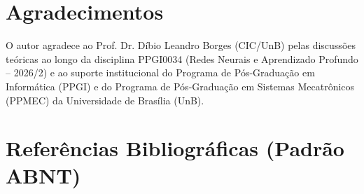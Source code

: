 \documentclass[9pt,conference]{IEEEtran}
\begin{document}
\section*{Agradecimentos}

O autor agradece ao Prof. Dr. D\'{i}bio Leandro Borges (CIC/UnB) pelas discuss\~{o}es te\'{o}ricas ao longo da disciplina PPGI0034 (Redes Neurais e Aprendizado Profundo -- 2026/2) e ao suporte institucional do Programa de P\'{o}s-Gradua\c{c}\~{a}o em Inform\'{a}tica (PPGI) e do Programa de P\'{o}s-Gradua\c{c}\~{a}o em Sistemas Mecatr\^{o}nicos (PPMEC) da Universidade de Bras\'{i}lia (UnB).

\section*{Refer\^{e}ncias Bibliogr\'{a}ficas (Padr\~{a}o ABNT)}
\end{document}
